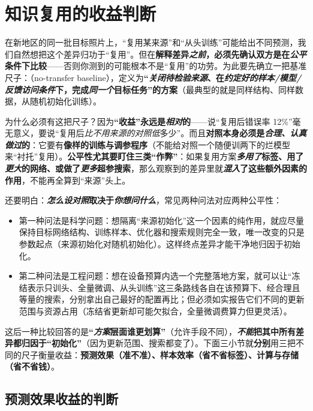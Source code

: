 \section{知识复用的收益判断}
\label{sec:ket-reuse-benefits}

在新地区的同一批目标照片上，“复用某来源”和“从头训练”可能给出不同预测，我们自然想把这个差异归功于“复用”。但在\textbf{解释差异\emph{之前}，必须先确认双方是在\emph{公平}条件下比较}——否则你测到的可能根本不是“复用”的功劳。为此要先确立一把基准尺子：（no-transfer baseline），定义为\textbf{“\emph{关闭待检验来源}、在\emph{约定好的样本/模型/反馈访问条件}下，完成\emph{同一个}目标任务”的方案}（最典型的就是同样结构、同样数据，从随机初始化训练）。

为什么必须有这把尺子？因为\textbf{“收益”永远是\emph{相对}的}——说“复用后错误率 12\%”毫无意义，要说“复用后\emph{比不用来源的对照}\emph{低}多少”。而且\textbf{对照本身必须是\emph{合理、认真做过}的}：它要有\textbf{像样的训练与调参程序}（不能给对照一个随便训两下的烂模型来“衬托”复用）。\textbf{公平性尤其要盯住三类“作弊”}：如果复用方案\textbf{\emph{多用了}标签、用了\emph{更大}的网络、或做了\emph{更多}超参搜索}，那么观察到的差异里就\textbf{\emph{混入}了这些额外因素的作用}，不能再全算到“来源”头上。

还要明白：\textbf{\emph{怎么设对照}取决于\emph{你想问什么}}，常见两种问法对应两种公平性：
\begin{itemize}\item 第一种问法是科学问题：想隔离“来源初始化”这一个因素的纯作用，就应尽量保持目标网络结构、训练样本、优化器和搜索规则完全一致，唯一改变的只是参数起点（来源初始化对随机初始化）。这样终点差异才能干净地归因于初始化。\item 第二种问法是工程问题：想在设备预算内选一个完整落地方案，就可以让“冻结表示只训头、全量微调、从头训练”这三条路线各自在该预算下、经合理且等量的搜索，分别拿出自己最好的配置再比；但必须如实报告它们不同的更新范围与资源占用（冻结省更新却可能欠拟合，全量微调费算力但更灵活）。\end{itemize}
这后一种比较回答的是\textbf{“\emph{方案}层面谁更划算”}（允许手段不同），\textbf{\emph{不能}把其中所有差异都归因于“初始化”}（因为更新范围、搜索都变了）。下面三小节就\textbf{分别}用三把不同的尺子衡量收益：\textbf{预测效果（准不准）、样本效率（省不省标签）、计算与存储（省不省钱）}。

\subsection{预测效果收益的判断}
\label{sec:ket-reuse-prediction}


